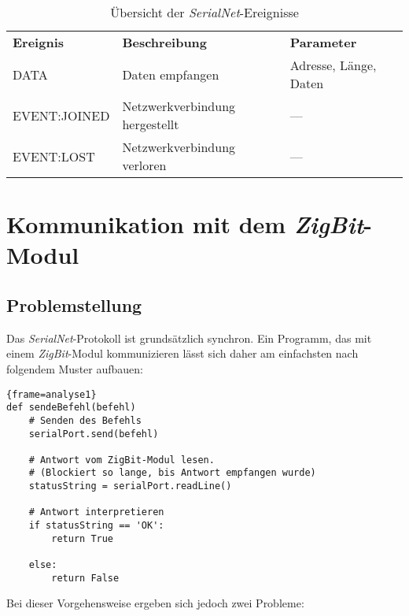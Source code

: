                \begin{table}
                    \begin{tabular}{lll}
                        \textbf{Ereignis} & \textbf{Beschreibung} & \textbf{Parameter}\\
                            DATA         & Daten empfangen & Adresse, Länge, Daten \\
                            EVENT:JOINED & Netzwerkverbindung hergestellt & --- \\
                            EVENT:LOST   & Netzwerkverbindung verloren & --- \\
                     \end{tabular}
                     \caption{Übersicht der \emph{SerialNet}-Ereignisse}
                     \label{serialnet_events}
                \end{table}


    \section{Kommunikation mit dem \emph{ZigBit}-Modul}\label{analyse_kommunikation_mit_zigbit_modul}
        \subsection{Problemstellung}
            Das \emph{SerialNet}-Protokoll ist grundsätzlich synchron. Ein Programm, das mit
            einem \emph{ZigBit}-Modul kommunizieren lässt sich daher am einfachsten nach folgendem
            Muster aufbauen:

            \begin{lstlisting}{frame=analyse1}
def sendeBefehl(befehl)
    # Senden des Befehls
    serialPort.send(befehl)

    # Antwort vom ZigBit-Modul lesen.
    # (Blockiert so lange, bis Antwort empfangen wurde)
    statusString = serialPort.readLine()

    # Antwort interpretieren
    if statusString == 'OK':
        return True
    
    else:
        return False
            \end{lstlisting}
           
        
            Bei dieser Vorgehensweise ergeben sich jedoch zwei Probleme:

